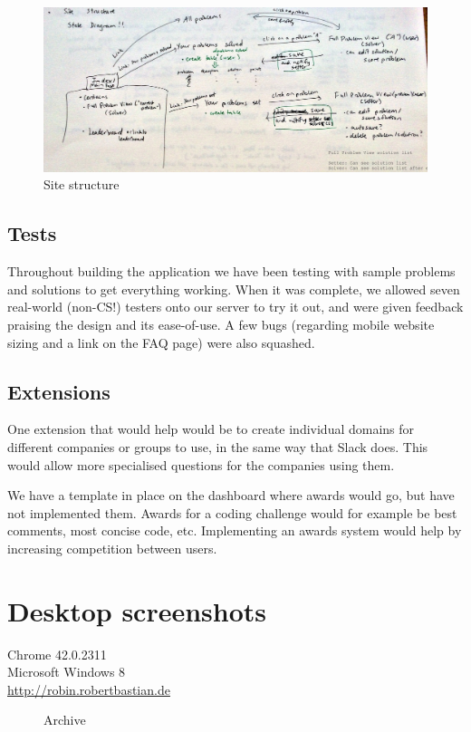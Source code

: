 \documentclass{report}
\begin{document}
\begin{figure}[H]
\includegraphics[width=\textwidth]{structure}
\caption{Site structure}
\end{figure}

\section{Tests}
Throughout building the application we have been testing with sample problems and solutions to get everything working. When it was complete, we allowed seven real-world (non-CS!) testers onto our server to try it out, and were given feedback praising the design and its ease-of-use. A few bugs (regarding mobile website sizing and a link on the FAQ page) were also squashed.

\section{Extensions}
One extension that would help would be to create individual domains for different companies or groups to use, in the same way that Slack does. This would allow more specialised questions for the companies using them.

We have a template in place on the dashboard where awards would go, but have not implemented them. Awards for a coding challenge would for example be best comments, most concise code, etc. Implementing an awards system would help by increasing competition between users.

\appendix

\chapter{Desktop screenshots}
Chrome 42.0.2311\\Microsoft Windows 8\\\url{http://robin.robertbastian.de}

\begin{figure}
\caption{Archive}
\end{figure}
\end{document}
